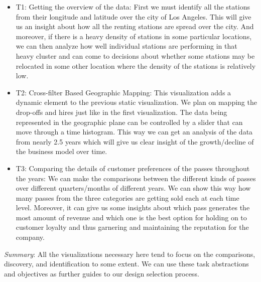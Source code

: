 \begin{itemize}
    \item T1: Getting the overview of the data: 
    First we must identify all the stations from their longitude and latitude over the city of Los Angeles. This will give us an insight about how all the renting stations are spread over the city. And moreover, if there is a heavy density of stations in some particular locations, we can then analyze how well individual stations are performing in that heavy cluster and can come to decisions about whether some stations may be relocated in some other location where the density of the stations is relatively low.

    \item T2: Cross-filter Based Geographic Mapping:
    This visualization adds a dynamic element to the previous static visualization. We plan on mapping the drop-offs and hires just like in the first visualization. The data being represented in the geographic plane can be controlled by a slider that can move through a time histogram. This way we can get an analysis of the data from nearly 2.5 years which will give us clear insight of the growth/decline of the business model over time.

    \item T3: Comparing the details of customer preferences of the passes throughout the years:
    We can make the comparisons between the different kinds of passes over different quarters/months of different years. We can show this way how many passes from the three categories are getting sold each at each time level. Moreover, it can give us some insights about which pass generates the most amount of revenue and which one is the best option for holding on to customer loyalty and thus garnering and maintaining the reputation for the company.
\end{itemize}

\textit{Summary}: All the visualizations necessary here tend to focus on the comparisons, discovery, and identification to some extent. We can use these task abstractions and objectives as further guides to our design selection process.